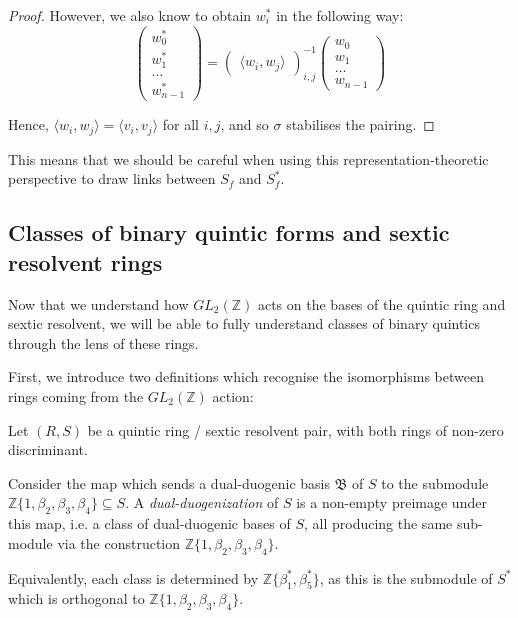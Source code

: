 \documentclass{article}
\begin{document}
\begin{proof}
However, we also know to obtain $w_i^*$ in the following way:
\begin{equation}
\begin{pmatrix}
w_0^* \\ w_1^* \\ \ldots \\ w_{n-1}^*
\end{pmatrix}
=
\begin{pmatrix}
\langle w_i,w_j \rangle
\end{pmatrix}^{-1}_{i,j}
\begin{pmatrix}
w_0 \\ w_1 \\ \ldots \\ w_{n-1}
\end{pmatrix}
\end{equation}

Hence, $\langle w_i,w_j \rangle = \langle v_i,v_j \rangle$ for all $i,j$, and so $\sigma$ stabilises the pairing.
\end{proof}

This means that we should be careful when using this representation-theoretic perspective to draw links between $S_f$ and $S_f^*$.

\subsection{Classes of binary quintic forms and sextic resolvent rings}

Now that we understand how $GL_2(\mathbb{Z})$ acts on the bases of the quintic ring and sextic resolvent, we will be able to fully understand classes of binary quintics through the lens of these rings.

First, we introduce two definitions which recognise the isomorphisms between rings coming from the $GL_2(\mathbb{Z})$ action:
\begin{definition}
Let $(R,S)$ be a quintic ring / sextic resolvent pair, with both rings of non-zero discriminant.

Consider the map which sends a dual-duogenic basis $\mathfrak{B}$ of $S$ to the submodule $\mathbb{Z} \{ 1, \beta_2, \beta_3, \beta_4 \} \subseteq S$.  A \emph{dual-duogenization} of $S$ is a non-empty preimage under this map, i.e. a class of dual-duogenic bases of $S$, all producing the same sub-module via the construction $\mathbb{Z} \{ 1, \beta_2, \beta_3, \beta_4 \}$.

Equivalently, each class is determined by $\mathbb{Z} \{ \beta_1^*, \beta_5^* \}$, as this is the submodule of $S^*$ which is orthogonal to $\mathbb{Z} \{ 1, \beta_2, \beta_3, \beta_4 \}$.
\end{definition}
\end{document}

